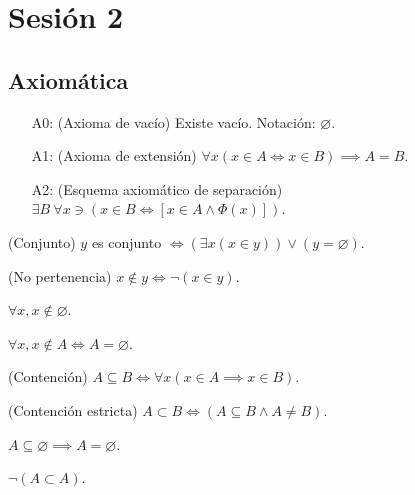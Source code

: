 \section{Sesión 2}

\subsection{Axiomática}
\begin{cajita}
\begin{enumerate}
	\item[A0:] (Axioma de vacío) Existe vacío. Notación: $\varnothing$.
	\item[A1:] (Axioma de extensión) $\forall x (x\in A \iff x\in B)\implies A =B$. 
	\item[A2:] (Esquema axiomático de separación) $\exists B\ \forall x \ni (x\in B\iff [x\in A\wedge \Phi(x)])$.
\end{enumerate}
\end{cajita}
\begin{definicion}(Conjunto)
	$y$ es conjunto $\iff(\exists x(x\in y))\vee (y=\varnothing)$. 
\end{definicion}

\begin{definicion}(No pertenencia)
	$x\not\in y \iff \neg (x\in y)$. 
\end{definicion}

\begin{teorema}
	$\forall x,x\not\in \varnothing$. 
\end{teorema}

\begin{teorema}
	$\forall x, x\not\in A \iff A=\varnothing$. 
\end{teorema}

\begin{definicion}(Contención)
	$A\subseteq B\iff \forall x(x\in A\implies x\in B)$. 
\end{definicion}

\begin{definicion}(Contención estricta)
	$A \subset B\iff(A\subseteq B\wedge A\neq B)$.
\end{definicion}

\begin{teorema}
	$A\subseteq \varnothing\implies A = \varnothing$. 
\end{teorema}

\begin{teorema}
	$\neg (A\subset A)$. 
\end{teorema}


